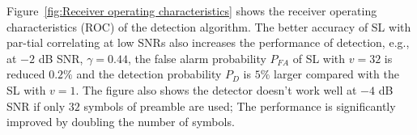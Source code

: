 Figure~\ref{fig:Receiver operating characteristics} shows the receiver operating characteristics (ROC) of the detection algorithm.
The better accuracy of SL with par-tial correlating at low SNRs also increases the performance of detection, e.g.,
at $-2$ dB SNR, $\gamma=0.44$, the false alarm probability $P_{FA}$ of SL with $v=32$ is reduced $0.2\%$ and 
the detection probability $P_{D}$ is $5\%$ larger compared with the SL with $v{=}1$.
The figure also shows the detector doesn't work well at $-4$ dB SNR if only $32$ symbols of preamble are used;  
The performance is significantly improved by doubling the number of symbols.
